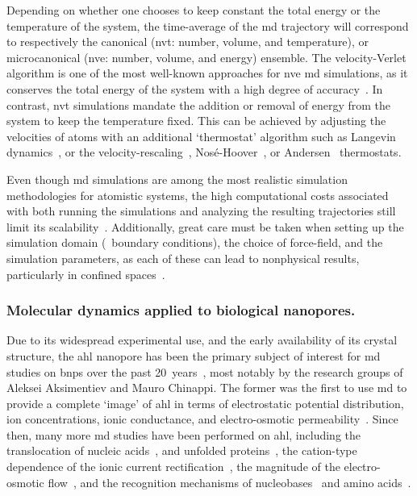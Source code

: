 Depending on whether one chooses to keep constant the total energy or the temperature of the system, the
time-average of the \gls{md} trajectory will correspond to respectively the canonical (\gls{nvt}: number,
volume, and temperature), or microcanonical (\gls{nve}: number, volume, and energy) ensemble. The
velocity-Verlet algorithm is one of the most well-known approaches for \gls{nve} \gls{md} simulations, as it
conserves the total energy of the system with a high degree of accuracy~\cite{Swope-1982}. In contrast,
\gls{nvt} simulations mandate the addition or removal of energy from the system to keep the temperature fixed.
This can be achieved by adjusting the velocities of atoms with an additional `thermostat' algorithm such as
Langevin dynamics~\cite{Bussi-2008}, or the velocity-rescaling~\cite{Heyes-1983},
Nos\'{e}-Hoover~\cite{Nose-1984,Hoover-1985}, or Andersen~\cite{Andersen-1980} thermostats.

Even though \gls{md} simulations are among the most realistic simulation methodologies for atomistic
systems, the high computational costs associated with both running the simulations and analyzing the
resulting trajectories still limit its scalability~\cite{Vendruscolo-2011,Phillips-2020}. Additionally, great
care must be taken when setting up the simulation domain (\ie~boundary conditions), the choice of force-field,
and the simulation parameters, as each of these can lead to nonphysical results, particularly in confined
spaces~\cite{Wong-ekkabut-2016a}.


\subsubsection{Molecular dynamics applied to biological nanopores.}
%

Due to its widespread experimental use, and the early availability of its crystal structure, the \gls{ahl}
nanopore has been the primary subject of interest for \gls{md} studies on \glspl{bnp} over the past
20~years~\cite{Aksimentiev-2005,DeBiase-2016,Basdevant-2019}, most notably by the research groups of Aleksei
Aksimentiev and Mauro Chinappi. The former was the first to use \gls{md} to provide a complete `image' of
\gls{ahl} in terms of electrostatic potential distribution, ion concentrations, ionic conductance, and
electro-osmotic permeability~\cite{Aksimentiev-2005}. Since then, many more \gls{md} studies have been
performed on \gls{ahl}, including the translocation of nucleic acids~\cite{Wells-2007}, and unfolded
proteins~\cite{DiMarino-2015}, the cation-type dependence of the ionic current
rectification~\cite{Bhattacharya-2011}, the magnitude of the electro-osmotic flow~\cite{Bonome-2017}, and the
recognition mechanisms of nucleobases~\cite{Manara-2015b,DeBiase-2016} and amino acids~\cite{DiMuccio-2019}.

